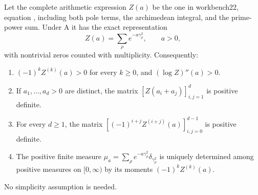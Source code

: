 \begin{theorem}
Let the complete arithmetic expression $Z(a)$ be the one in
workbench22, equation , including
both pole terms, the archimedean integral, and the prime-power sum.
Under A it has the exact representation
\[
 Z(a)=\sum_\rho e^{-a\gamma_\rho^2},\qquad a>0,
\]
with nontrivial zeros counted with multiplicity. Consequently:
\begin{enumerate}
\item $(-1)^kZ^{(k)}(a)>0$ for every $k\ge0$, and
$(\log Z)''(a)>0$.
\item If $a_1,\ldots,a_d>0$ are distinct, the matrix
$[Z(a_i+a_j)]_{i,j=1}^d$ is positive definite.
\item For every $d\ge1$, the matrix
$[(-1)^{i+j}Z^{(i+j)}(a)]_{i,j=0}^{d-1}$ is positive definite.
\item The positive finite measure
$\mu_a=\sum_\rho e^{-a\gamma_\rho^2}\delta_{\gamma_\rho^2}$
is uniquely determined among positive measures on $[0,\infty)$ by its
moments $(-1)^kZ^{(k)}(a)$.
\end{enumerate}
No simplicity assumption is needed.
\end{theorem}
